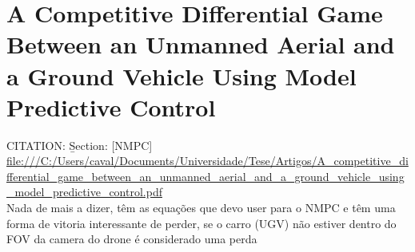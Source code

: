 \section{A Competitive Differential Game Between an Unmanned Aerial and a Ground Vehicle Using Model Predictive Control}\label{A Competitive Differential Game Between an Unmanned Aerial and a Ground Vehicle Using Model Predictive Control}
CITATION: \cite{7535979} \b{Section: [NMPC]}\\
\url{file:///C:/Users/caval/Documents/Universidade/Tese/Artigos/A_competitive_differential_game_between_an_unmanned_aerial_and_a_ground_vehicle_using_model_predictive_control.pdf}\\
Nada de mais a dizer, têm as equações que devo user para o NMPC e têm uma forma de vitoria interessante de perder, 
se o carro (UGV) não estiver dentro do FOV da camera do drone é considerado uma perda
